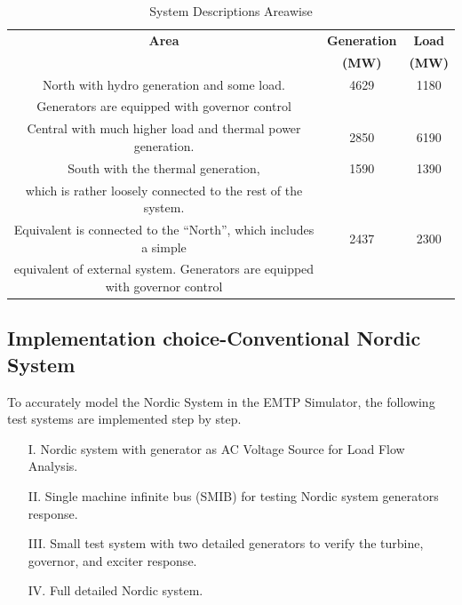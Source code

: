 \documentclass{report}
\begin{document}
\begin{table}[h!]
\centering
\caption{System Descriptions Areawise}
\begin{tabular}{|c|c|c|}
 \hline
 \textbf{Area}  & \textbf{Generation } & \textbf{Load}\\
  \textbf{}  & \textbf{(MW)} & \textbf{(MW)}\\
 \hline
 North with hydro generation and some load.
 & 4629 & 1180 \\
  Generators are equipped with governor control & & \\
 \hline
 Central with much higher load and thermal power generation.
& 2850 & 6190\\
 \hline
South with the thermal generation, 
 & 1590 & 1390 \\
  which is rather loosely connected to the rest of the system. & & \\
 \hline
 Equivalent is connected to the “North”, which includes a simple   &
 2437 & 2300\\
 equivalent of external system. Generators are equipped with governor control &  & \\
 \hline
 \hline
\end{tabular}
\label{System Descriptions Area Wise}
\end{table}

\subsection{Implementation choice-Conventional Nordic System}
To accurately model the Nordic System in the EMTP Simulator, the following test systems are implemented step by step.
\begin{itemize}
    \item[I.]  Nordic system with generator as AC Voltage Source for Load Flow Analysis.
    \item[II.]  Single machine infinite bus (SMIB) for testing Nordic system generators response.
    \item[III.]  Small test system with two detailed generators to verify the turbine, governor, and exciter response. 
    \item[IV.]  Full detailed Nordic system.
\end{itemize}
\end{document}
